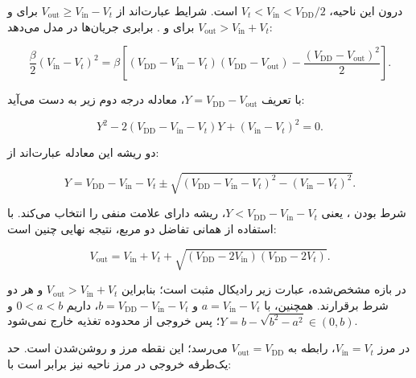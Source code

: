 درون این ناحیه، \(V_t<V_{\mathrm{in}}<V_{\mathrm{DD}}/2\) است. شرایط  عبارت‌اند از \(V_{\mathrm{out}}\ge V_{\mathrm{in}}-V_t\) برای  و \(V_{\mathrm{out}}>V_{\mathrm{in}}+V_t\) برای  \cite[جدول‌های  و ]{weste} و \cite[اسلایدهای ۵ تا ۷]{dcslides}. برابری جریان‌ها در مدل  می‌دهد:

\nopagebreak[3]
\begin{equation}\label{eq:ex16-3}
\frac{\beta}{2}(V_{\mathrm{in}}-V_t)^2
=\beta\left[
(V_{\mathrm{DD}}-V_{\mathrm{in}}-V_t)(V_{\mathrm{DD}}-V_{\mathrm{out}})
-\frac{(V_{\mathrm{DD}}-V_{\mathrm{out}})^2}{2}
\right].
\end{equation}

با تعریف \(Y=V_{\mathrm{DD}}-V_{\mathrm{out}}\)، معادله درجه دوم زیر به دست می‌آید:

\nopagebreak[3]
\begin{equation}\label{eq:ex16-4}
Y^2-2(V_{\mathrm{DD}}-V_{\mathrm{in}}-V_t)Y
+(V_{\mathrm{in}}-V_t)^2=0.
\end{equation}

دو ریشه این معادله عبارت‌اند از:

\nopagebreak[3]
\begin{equation}\label{eq:ex16-5}
Y=V_{\mathrm{DD}}-V_{\mathrm{in}}-V_t
\pm\sqrt{(V_{\mathrm{DD}}-V_{\mathrm{in}}-V_t)^2-(V_{\mathrm{in}}-V_t)^2}.
\end{equation}

شرط  بودن ، یعنی \(Y<V_{\mathrm{DD}}-V_{\mathrm{in}}-V_t\)، ریشه دارای علامت منفی را انتخاب می‌کند. با استفاده از همانی تفاضل دو مربع، نتیجه نهایی چنین است:

\nopagebreak[3]
\begin{equation}\label{eq:ex16-6}
\boxed{
V_{\mathrm{out}}
=V_{\mathrm{in}}+V_t
+\sqrt{(V_{\mathrm{DD}}-2V_{\mathrm{in}})(V_{\mathrm{DD}}-2V_t)}
}.
\end{equation}

در بازه مشخص‌شده، عبارت زیر رادیکال مثبت است؛ بنابراین \(V_{\mathrm{out}}>V_{\mathrm{in}}+V_t\) و هر دو شرط  برقرارند. همچنین، با \(a=V_{\mathrm{in}}-V_t\) و \(b=V_{\mathrm{DD}}-V_{\mathrm{in}}-V_t\)، داریم \(0<a<b\) و \(Y=b-\sqrt{b^2-a^2}\in(0,b)\)؛ پس خروجی از محدوده تغذیه خارج نمی‌شود.

در مرز \(V_{\mathrm{in}}=V_t\)، رابطه به \(V_{\mathrm{out}}=V_{\mathrm{DD}}\) می‌رسد؛ این نقطه مرز  و روشن‌شدن  است. حد یک‌طرفه خروجی در مرز ناحیه  نیز برابر است با:

